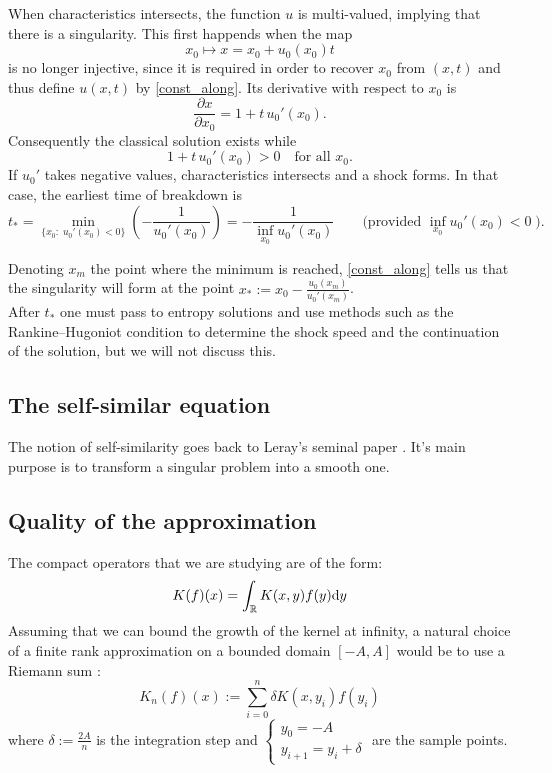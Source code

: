 \documentclass[11pt,a4paper]{article}
\begin{document}
\noindent When characteristics intersects, the function $u$ is multi-valued, implying that there is a singularity. This first happends when the map
\[x_0\mapsto x=x_0+u_0(x_0)t\]
is no longer injective, since it is required in order to recover $x_0$ from $(x,t)$ and thus define $u(x,t)$ by \eqref{const_along}. Its derivative with respect to $x_0$ is
\[
\frac{\partial x}{\partial x_0}=1+t\,u_0'(x_0).
\]
Consequently the classical solution exists while
\[1+t\,u_0'(x_0)>0\quad\text{for all }x_0.
\]
If $u_0'$ takes negative values, characteristics intersects and a shock forms. In that case, the earliest time of breakdown is
\begin{equation}\label{break_time}
t_* = \min_{\{x_0:\;u_0'(x_0)<0\}}\left(-\frac{1}{u_0'(x_0)}\right)
= -\frac{1}{\inf_{x_0}u_0'(x_0)}\qquad\text{(provided }\inf_{x_0}u_0'(x_0)<0\;).
\end{equation}

\noindent Denoting $x_m$ the point where the minimum is reached,  \eqref{const_along} tells us that the singularity will form at the point $x_* := x_0 - \frac{u_0(x_m)}{u_0'(x_m)}$. \\
After $t_*$ one must pass to entropy solutions and use methods such as the Rankine--Hugoniot condition to determine the shock speed and the continuation of the solution, but we will not discuss this.

\subsection{The self-similar equation}
The notion of self-similarity goes back to Leray's seminal paper \cite{leray1934}. It's main purpose is to transform a singular problem into a smooth one.



\subsection{ Quality of the approximation}
The compact operators that we are studying are of the form: \[K(f)(x) = \int_\mathbb R K(x,y)f(y)\mathrm{d}y \]
Assuming that we can bound the growth of the kernel at infinity, a natural choice of a finite rank approximation on a bounded domain $[-A,A]$ would be to use a Riemann sum : \[K_n(f)(x) := \sum_{i=0}^n \delta K(x,y_i)f(y_i)\]
where $\delta := \frac{2A}{n}$ is the integration step and $\begin{cases} y_0=-A \\ y_{i+1}=y_i + \delta \end{cases}$ are the sample points. \\
\end{document}
